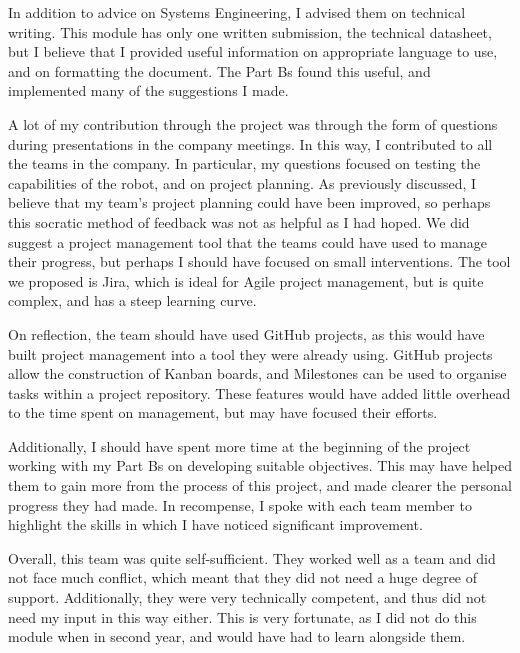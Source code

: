         In addition to advice on Systems Engineering, I advised them on technical writing.
        This module has only one written submission, the technical datasheet, but I believe that I provided useful information on appropriate language to use, and on formatting the document.
        The Part Bs found this useful, and implemented many of the suggestions I made.

        A lot of my contribution through the project was through the form of questions during presentations in the company meetings.
        In this way, I contributed to all the teams in the company.
        In particular, my questions focused on testing the capabilities of the robot, and on project planning.
        As previously discussed, I believe that my team's project planning could have been improved, so perhaps this socratic method of feedback was not as helpful as I had hoped.
        We did suggest a project management tool that the teams could have used to manage their progress, but perhaps I should have focused on small interventions.
        The tool we proposed is Jira, which is ideal for Agile project management, but is quite complex, and has a steep learning curve.

        On reflection, the team should have used GitHub projects, as this would have built project management into a tool they were already using.
        GitHub projects allow the construction of Kanban boards, and Milestones can be used to organise tasks within a project repository.
        These features would have added little overhead to the time spent on management, but may have focused their efforts.

        Additionally, I should have spent more time at the beginning of the project working with my Part Bs on developing suitable objectives.
        This may have helped them to gain more from the process of this project, and made clearer the personal progress they had made.
        In recompense, I spoke with each team member to highlight the skills in which I have noticed significant improvement.

        Overall, this team was quite self-sufficient.
        They worked well as a team and did not face much conflict, which meant that they did not need a huge degree of support.
        Additionally, they were very technically competent, and thus did not need my input in this way either.
        This is very fortunate, as I did not do this module when in second year, and would have had to learn alongside them.

